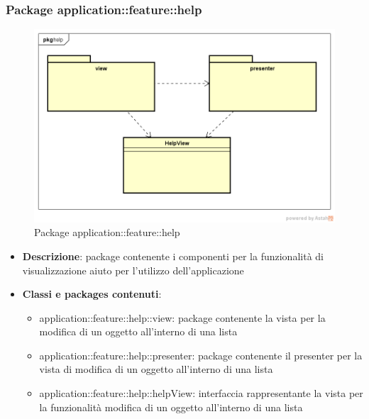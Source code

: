 \subsubsection{Package application::feature::help}
\label{Package application::feature::help}
\begin{figure}[H]
	\centering
	\includegraphics[scale=0.5]{Sezioni/Packages/Application/help.png}
	\caption{Package application::feature::help}
\end{figure}
\begin{itemize}
	\item \textbf{Descrizione}: package contenente i componenti per la funzionalità di visualizzazione aiuto per l'utilizzo dell'applicazione
	\item \textbf{Classi e packages contenuti}:
	\begin{itemize}
	\item application::feature::help::view: package contenente la vista per la modifica di un oggetto all'interno di una lista
	\item application::feature::help::presenter: package contenente il presenter per la vista di modifica di un oggetto all'interno di una lista
	\item application::feature::help::helpView: interfaccia rappresentante la vista per la funzionalità modifica di un oggetto all'interno di una lista
	\end{itemize}
\end{itemize}

